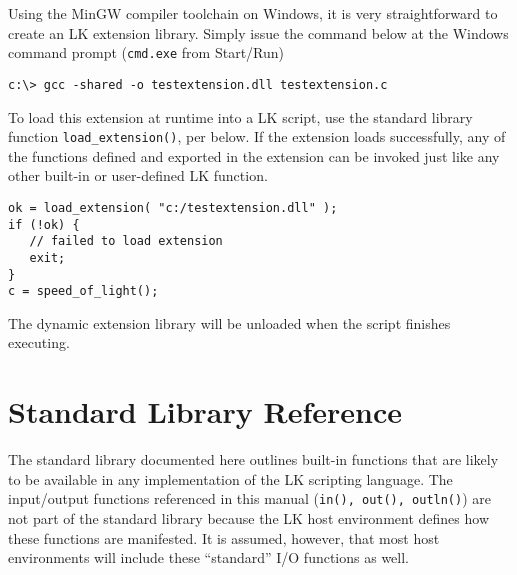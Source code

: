 \documentclass{article}
\begin{document}
Using the MinGW compiler toolchain on Windows, it is very straightforward to create an LK extension library.  Simply issue the command below at the Windows command prompt (\texttt{cmd.exe} from Start/Run)

\begin{verbatim}
c:\> gcc -shared -o testextension.dll testextension.c
\end{verbatim}

To load this extension at runtime into a LK script, use the standard library function \texttt{load\_extension()}, per below.  If the extension loads successfully, any of the functions defined and exported in the extension can be invoked just like any other built-in or user-defined LK function.

\begin{verbatim}
ok = load_extension( "c:/testextension.dll" );
if (!ok) {
   // failed to load extension
   exit;
}
c = speed_of_light();
\end{verbatim}

The dynamic extension library will be unloaded when the script finishes executing.



\section{Standard Library Reference}

The standard library documented here outlines built-in functions that are likely to be available in any implementation of the LK scripting language.  The input/output functions referenced in this manual (\texttt{in(), out(), outln()}) are not part of the standard library because the LK host environment defines how these functions are manifested.  It is assumed, however, that most host environments will include these ``standard'' I/O functions as well.






\end{document}
